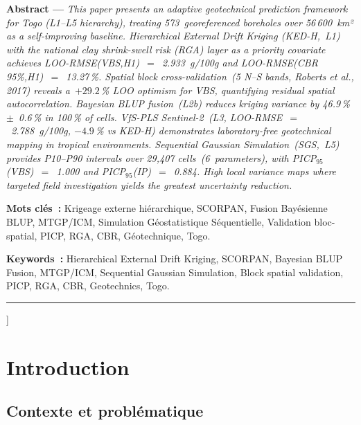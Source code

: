 \documentclass[10pt,a4paper,twocolumn]{article}
\begin{document}
	\smallskip
	\noindent\small
	\textbf{Abstract ---} \textit{%
		This paper presents an adaptive geotechnical prediction framework for
		Togo (L1--L5 hierarchy), treating 573~georeferenced boreholes over
		56\,600~km² as a self-improving baseline. Hierarchical External Drift
		Kriging (KED-H,~L1) with the national clay shrink-swell risk (RGA)
		layer as a priority covariate achieves LOO-RMSE(VBS,H1)~$=$~2.933~g/100g
		and LOO-RMSE(CBR\,95\%,H1)~$=$~13.27\,\%.
		Spatial block cross-validation~(5 N--S bands, Roberts et al., 2017)
		reveals a~$+29.2$\,\% LOO optimism for VBS, quantifying residual
		spatial autocorrelation. Bayesian BLUP fusion~(L2b) reduces kriging
		variance by 46.9\,\%~$\pm$~0.6\,\% in 100\,\% of cells.
		VfS-PLS Sentinel-2~(L3, LOO-RMSE~$=$~2.788~g/100g, $-4.9$\,\% vs KED-H)
		demonstrates laboratory-free geotechnical mapping in tropical environments.
		Sequential Gaussian Simulation~(SGS,~L5) provides P10--P90 intervals
		over 29,407 cells~(6~parameters), with PICP$_{95}$(VBS)~$=$~1.000 and
		PICP$_{95}$(IP)~$=$~0.884. High local variance maps where targeted
		field investigation yields the greatest uncertainty reduction.
	}
	
	\smallskip
	\noindent\small
	\textbf{Mots clés~:} Krigeage externe hiérarchique, SCORPAN,
	Fusion Bayésienne BLUP, MTGP/ICM, Simulation Géostatistique Séquentielle,
	Validation bloc-spatial, PICP, RGA, CBR, Géotechnique, Togo.
	\smallskip

	\noindent\small
	\textbf{Keywords~:} Hierarchical External Drift Kriging, SCORPAN,
	Bayesian BLUP Fusion, MTGP/ICM, Sequential Gaussian Simulation,
	Block spatial validation, PICP, RGA, CBR, Geotechnics, Togo.
	
	\vspace{0.15cm}
	\rule{\linewidth}{0.4pt}
	\vspace{0.3cm}
	]
	
	\section{Introduction}
	\label{sec:intro}
	
	\subsection{Contexte et problématique}
	\label{subsec:contexte}
	
\end{document}

